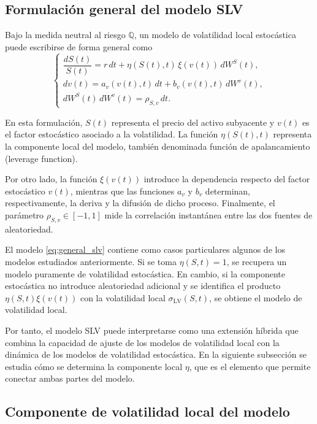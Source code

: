 \subsection{Formulación general del modelo SLV}

Bajo la medida neutral al riesgo \(\mathbb{Q}\), un modelo de volatilidad local estocástica puede escribirse de forma general como
\begin{equation}
\label{eq:general_slv}
\begin{cases}
\dfrac{dS(t)}{S(t)}
=
r\,dt+\eta(S(t),t)\,\xi(v(t))\,dW^S(t), \\[0.25cm]
dv(t)
=
a_v(v(t),t)\,dt+b_v(v(t),t)\,dW^v(t), \\[0.25cm]
dW^S(t)\,dW^v(t)=\rho_{S,v}\,dt.
\end{cases}
\end{equation}

En esta formulación, \(S(t)\) representa el precio del activo subyacente y \(v(t)\) es el factor estocástico asociado a la volatilidad. La función \(\eta(S(t),t)\) representa la componente local del modelo, también denominada función de apalancamiento (leverage function).\medskip

Por otro lado, la función \(\xi(v(t))\) introduce la dependencia respecto del factor estocástico \(v(t)\), mientras que las funciones \(a_v\) y \(b_v\) determinan, respectivamente, la deriva y la difusión de dicho proceso. Finalmente, el parámetro \(\rho_{S,v}\in[-1,1]\) mide la correlación instantánea entre las dos fuentes de aleatoriedad.\medskip

El modelo \ref{eq:general_slv} contiene como casos particulares algunos de los modelos estudiados anteriormente. Si se toma \(\eta(S,t)=1\), se recupera un modelo puramente de volatilidad estocástica. En cambio, si la componente estocástica no introduce aleatoriedad adicional y se identifica el producto \(\eta(S,t)\xi(v(t))\) con la volatilidad local \(\sigma_{\mathrm{LV}}(S,t)\), se obtiene el modelo de volatilidad local.\medskip

Por tanto, el modelo SLV puede interpretarse como una extensión híbrida que combina la capacidad de ajuste de los modelos de volatilidad local con la dinámica de los modelos de volatilidad estocástica. En la siguiente subsección se estudia cómo se determina la componente local \(\eta\), que es el elemento que permite conectar ambas partes del modelo.

\subsection{Componente de volatilidad local del modelo}

